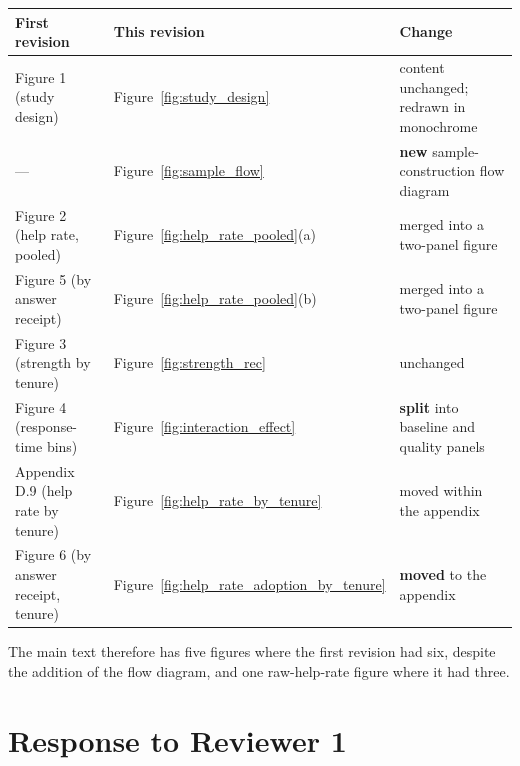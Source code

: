 \documentclass[11pt]{article}
\begin{document}
\begin{center}
\begin{tabular}{@{}lll@{}}
\toprule
\textbf{First revision} & \textbf{This revision} & \textbf{Change}\\
\midrule
Figure 1 (study design)              & Figure~\ref{fig:study_design}    & content unchanged; redrawn in monochrome\\
---                                  & Figure~\ref{fig:sample_flow}     & \textbf{new} sample-construction flow diagram\\
Figure 2 (help rate, pooled)         & Figure~\ref{fig:help_rate_pooled}(a) & merged into a two-panel figure\\
Figure 5 (by answer receipt)         & Figure~\ref{fig:help_rate_pooled}(b) & merged into a two-panel figure\\
Figure 3 (strength by tenure)        & Figure~\ref{fig:strength_rec}    & unchanged\\
Figure 4 (response-time bins)        & Figure~\ref{fig:interaction_effect} & \textbf{split} into baseline and quality panels\\
Appendix D.9 (help rate by tenure)   & Figure~\ref{fig:help_rate_by_tenure} & moved within the appendix\\
Figure 6 (by answer receipt, tenure) & Figure~\ref{fig:help_rate_adoption_by_tenure} & \textbf{moved} to the appendix\\
\bottomrule
\end{tabular}
\end{center}

The main text therefore has five figures where the first revision had six, despite the addition of the flow diagram, and one raw-help-rate figure where it had three.

\section*{Response to Reviewer 1}
\end{document}
